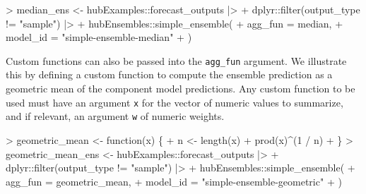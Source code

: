 \documentclass[
]{article}
\newenvironment{Shaded}{\begin{snugshade}}{\end{snugshade}}
\newcommand{\AttributeTok}[1]{\textcolor[rgb]{0.40,0.45,0.13}{#1}}
\newcommand{\ControlFlowTok}[1]{\textcolor[rgb]{0.00,0.23,0.31}{#1}}
\newcommand{\DecValTok}[1]{\textcolor[rgb]{0.68,0.00,0.00}{#1}}
\newcommand{\FunctionTok}[1]{\textcolor[rgb]{0.28,0.35,0.67}{#1}}
\newcommand{\NormalTok}[1]{\textcolor[rgb]{0.00,0.23,0.31}{#1}}
\newcommand{\OtherTok}[1]{\textcolor[rgb]{0.00,0.23,0.31}{#1}}
\newcommand{\SpecialCharTok}[1]{\textcolor[rgb]{0.37,0.37,0.37}{#1}}
\newcommand{\StringTok}[1]{\textcolor[rgb]{0.13,0.47,0.30}{#1}}
\begin{document}
\begin{Shaded}
\begin{Highlighting}[]
\SpecialCharTok{\textgreater{}}\NormalTok{ median\_ens }\OtherTok{\textless{}{-}}\NormalTok{ hubExamples}\SpecialCharTok{::}\NormalTok{forecast\_outputs }\SpecialCharTok{|\textgreater{}}
\SpecialCharTok{+}\NormalTok{   dplyr}\SpecialCharTok{::}\FunctionTok{filter}\NormalTok{(output\_type }\SpecialCharTok{!=} \StringTok{"sample"}\NormalTok{) }\SpecialCharTok{|\textgreater{}}
\SpecialCharTok{+}\NormalTok{   hubEnsembles}\SpecialCharTok{::}\FunctionTok{simple\_ensemble}\NormalTok{(}
\SpecialCharTok{+}     \AttributeTok{agg\_fun =}\NormalTok{ median,}
\SpecialCharTok{+}     \AttributeTok{model\_id =} \StringTok{"simple{-}ensemble{-}median"}
\SpecialCharTok{+}\NormalTok{   )}
\end{Highlighting}
\end{Shaded}

Custom functions can also be passed into the \texttt{agg\_fun} argument.
We illustrate this by defining a custom function to compute the ensemble
prediction as a geometric mean of the component model predictions. Any
custom function to be used must have an argument \texttt{x} for the
vector of numeric values to summarize, and if relevant, an argument
\texttt{w} of numeric weights.

\begin{Shaded}
\begin{Highlighting}[]
\SpecialCharTok{\textgreater{}}\NormalTok{ geometric\_mean }\OtherTok{\textless{}{-}} \ControlFlowTok{function}\NormalTok{(x) \{}
\SpecialCharTok{+}\NormalTok{   n }\OtherTok{\textless{}{-}} \FunctionTok{length}\NormalTok{(x)}
\SpecialCharTok{+}   \FunctionTok{prod}\NormalTok{(x)}\SpecialCharTok{\^{}}\NormalTok{(}\DecValTok{1} \SpecialCharTok{/}\NormalTok{ n)}
\SpecialCharTok{+}\NormalTok{ \}}
\SpecialCharTok{\textgreater{}}\NormalTok{ geometric\_mean\_ens }\OtherTok{\textless{}{-}}\NormalTok{ hubExamples}\SpecialCharTok{::}\NormalTok{forecast\_outputs }\SpecialCharTok{|\textgreater{}}
\SpecialCharTok{+}\NormalTok{   dplyr}\SpecialCharTok{::}\FunctionTok{filter}\NormalTok{(output\_type }\SpecialCharTok{!=} \StringTok{"sample"}\NormalTok{) }\SpecialCharTok{|\textgreater{}}
\SpecialCharTok{+}\NormalTok{   hubEnsembles}\SpecialCharTok{::}\FunctionTok{simple\_ensemble}\NormalTok{(}
\SpecialCharTok{+}     \AttributeTok{agg\_fun =}\NormalTok{ geometric\_mean,}
\SpecialCharTok{+}     \AttributeTok{model\_id =} \StringTok{"simple{-}ensemble{-}geometric"}
\SpecialCharTok{+}\NormalTok{   )}
\end{Highlighting}
\end{Shaded}
\end{document}
